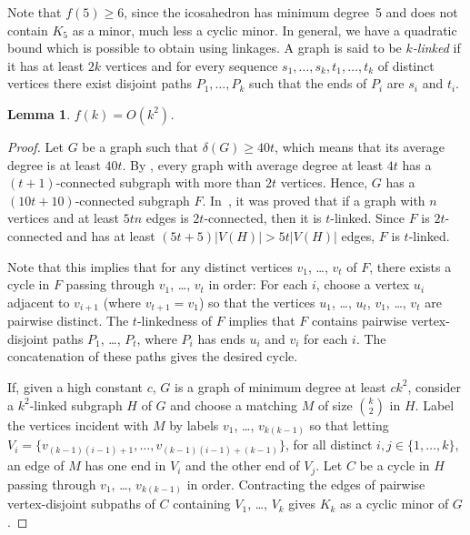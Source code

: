 \documentclass[11pt]{article}
\newtheorem{lemma}[theo]{Lemma}
\begin{document}



Note that $f(5)\ge 6$, since the icosahedron has minimum degree~5 and does not contain $K_5$ as a minor, much less a cyclic minor. In general, we have a quadratic bound which is possible to obtain using linkages. A graph is said to be \emph{$k$-linked} if it has at least $2k$ vertices and for every sequence $s_1, \ldots, s_k, t_1, \ldots, t_k$ of distinct vertices there exist disjoint paths $P_1, \ldots, P_k$ such that the ends of $P_i$ are $s_i$ and $t_i$. 

\begin{lemma}\label{l:quadr}
$f(k)=O(k^2)$.
\end{lemma}
\begin{proof}



Let $G$ be a graph such that $\delta(G)\geq  40t$, which means that its average degree is at least $40t$. By \cite{MADER72}, every graph with average degree at least $4t$ has a $(t+1)$-connected subgraph with more than $2t$ vertices. Hence, $G$ has a $(10t+10)$-connected subgraph $F$. In~\cite{THOMAS2005309}, it was proved that if a graph with $n$ vertices and at least $5tn$ edges is $2t$-connected, then it is $t$-linked. Since $F$ is $2t$-connected and has at least $(5t+5)|V(H)|>5t|V(H)|$ edges, $F$ is $t$-linked.

Note that this implies that for any distinct vertices $v_1$, \ldots, $v_t$ of $F$, there exists a cycle in $F$ passing through $v_1$, \ldots, $v_t$ in order: For each $i$, choose a vertex $u_i$ adjacent to $v_{i+1}$ (where $v_{t+1}=v_1$) so that the vertices $u_1$, \ldots, $u_t$, $v_1$, \ldots, $v_t$ are pairwise distinct.  The $t$-linkedness of $F$ implies that $F$ contains pairwise vertex-disjoint paths $P_1$, \ldots, $P_t$, where $P_i$ has ends $u_i$ and $v_i$ for each $i$. The concatenation of these paths gives the desired cycle.

If, given a high constant $c$, $G$ is a graph of minimum degree at least $ck^2$, consider a $k^2$-linked subgraph $H$ of $G$ and choose a matching $M$ of size $\binom{k}{2}$ in $H$. Label the vertices incident with $M$ by labels $v_1$, \ldots, $v_{k(k-1)}$ so that letting $V_i=\{v_{(k-1)(i-1)+1},\ldots, v_{(k-1)(i-1)+(k-1)}\}$, for all distinct $i,j\in \{1,\ldots,k\}$, an edge of $M$ has one end in $V_i$ and the other end of $V_j$. Let $C$ be a cycle in $H$ passing through $v_1$, \ldots, $v_{k(k-1)}$ in order.  Contracting the edges of pairwise vertex-disjoint subpaths of $C$ containing $V_1$, \ldots, $V_k$ gives $K_k$ as a cyclic minor of $G$.
\end{proof}
\end{document}
